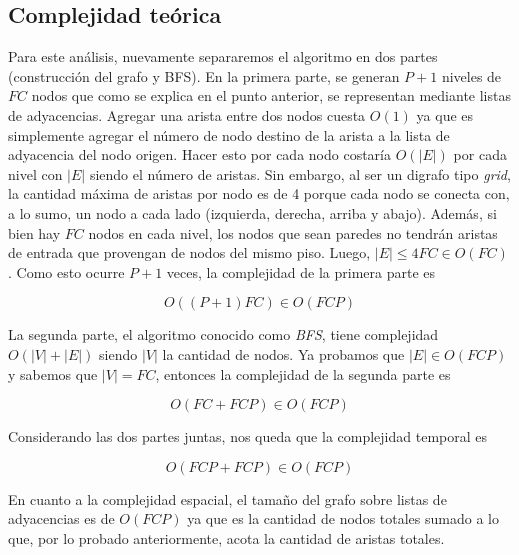 \begin{itemize}
    \subsection{Complejidad teórica}

      Para este análisis, nuevamente separaremos el algoritmo en dos partes (construcción del grafo y BFS). En la primera parte, se generan $P+1$ niveles de $FC$ nodos que como se explica en el punto anterior, se representan mediante listas de adyacencias. Agregar una arista entre dos nodos cuesta $O(1)$ ya que es simplemente agregar el número de nodo destino de la arista a la lista de adyacencia del nodo origen. Hacer esto por cada nodo costaría $O(|E|)$ por cada nivel con $|E|$ siendo el número de aristas. Sin embargo, al ser un digrafo tipo \textit{grid}, la cantidad máxima de aristas por nodo es de 4 porque cada nodo se conecta con, a lo sumo, un nodo a cada lado (izquierda, derecha, arriba y abajo). Además, si bien hay $FC$ nodos en cada nivel, los nodos que sean paredes no tendrán aristas de entrada que provengan de nodos del mismo piso. Luego, $|E| \leq 4FC \in O(FC)$. Como esto ocurre $P+1$ veces, la complejidad de la primera parte es

      \[
        O((P+1)FC) \in O(FCP)
      \]


      La segunda parte, el algoritmo conocido como \textit{BFS}, tiene complejidad $O(|V| + |E|)$ siendo $|V|$ la cantidad de nodos. Ya probamos que $|E| \in O(FCP)$ y sabemos que $|V| = FC$, entonces la complejidad de la segunda parte es

      \[
        O(FC + FCP) \in O(FCP)
      \]

      Considerando las dos partes juntas, nos queda que la complejidad temporal es

      \[
        O(FCP + FCP) \in O(FCP)
      \]

      En cuanto a la complejidad espacial, el tamaño del grafo sobre listas de adyacencias es de $O(FCP)$ ya que es la cantidad de nodos totales sumado a lo que, por lo probado anteriormente, acota la cantidad de aristas totales.




\end{itemize}
